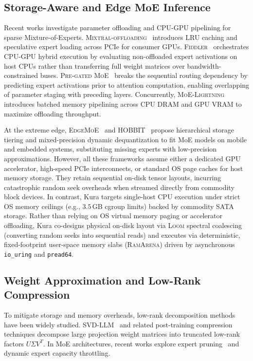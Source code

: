 \subsection{Storage-Aware and Edge MoE Inference}
Recent works investigate parameter offloading and CPU-GPU pipelining for sparse Mixture-of-Experts. \textsc{Mixtral-offloading}~\citep{eliseev2023fast} introduces LRU caching and speculative expert loading across PCIe for consumer GPUs. \textsc{Fiddler}~\citep{kamahori2025fiddler} orchestrates CPU-GPU hybrid execution by evaluating non-offloaded expert activations on host CPUs rather than transferring full weight matrices over bandwidth-constrained buses. \textsc{Pre-gated MoE}~\citep{hwang2024pregated} breaks the sequential routing dependency by predicting expert activations prior to attention computation, enabling overlapping of parameter staging with preceding layers. Concurrently, \textsc{MoE-Lightning}~\citep{song2024moelightning} introduces batched memory pipelining across CPU DRAM and GPU VRAM to maximize offloading throughput.

At the extreme edge, \textsc{EdgeMoE}~\citep{kundu2023edgemoe} and \mbox{\textsc{HOBBIT}}~\citep{tang2024hobbit} propose hierarchical storage tiering and mixed-precision dynamic dequantization to fit MoE models on mobile and embedded systems, substituting missing experts with low-precision approximations. However, all these frameworks assume either a dedicated GPU accelerator, high-speed PCIe interconnects, or standard OS page caches for host memory storage. They retain sequential on-disk tensor layouts, incurring catastrophic random seek overheads when streamed directly from commodity block devices. In contrast, Kura targets single-host CPU execution under strict OS memory ceilings (e.g., $3.5$\,GB cgroup limits) backed by commodity SATA storage. Rather than relying on OS virtual memory paging or accelerator offloading, Kura co-designs physical on-disk layout via \textsc{Loom} spectral coalescing (converting random seeks into sequential reads) and executes via deterministic, fixed-footprint user-space memory slabs (\textsc{RamArena}) driven by asynchronous \texttt{io\_uring} and \texttt{pread64}.

\subsection{Weight Approximation and Low-Rank Compression}
To mitigate storage and memory overheads, low-rank decomposition methods have been widely studied. \textsc{SVD-LLM}~\citep{wang2024svdllm} and related post-training compression techniques decompose large projection weight matrices into truncated low-rank factors $U \Sigma V^T$. In MoE architectures, recent works explore expert pruning~\citep{chen2023pruning} and dynamic expert capacity throttling. 

